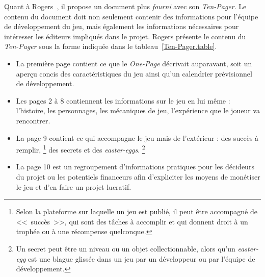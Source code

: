 



Quant \`a Rogers~\cite{LevelUpRogers2014}, il  propose un document plus \emph{fourni} avec son \emph{Ten-Pager}.
Le contenu du document doit non seulement contenir des informations pour l'équipe de développement du jeu, mais également les informations nécessaires pour int\'eresser les éditeurs impliqués dans le projet.
Rogers présente le contenu du \emph{Ten-Pager} sous la forme indiqu\'ee dans le tableau~\ref{Ten-Pager.table}.


\goodbreak

\begin{samepage}

\begin{itemize}

\item La première page contient ce que le \emph{One-Page} décrivait auparavant, soit un aperçu concis des caractéristiques du jeu ainsi qu'un calendrier prévisionnel de d\'eveloppement.

\item Les pages 2 à 8 contiennent les informations sur le jeu en lui même : l'histoire, les personnages, les mécaniques de jeu, l'expérience que le joueur va rencontrer.

\item La page 9 contient ce qui accompagne le jeu mais de l'extérieur : des succès à remplir, \footnote{Selon la plateforme sur laquelle un jeu est publié, il peut être accompagné de <<~succès~>>, qui sont des tâches à accomplir et qui donnent droit à un trophée ou \`a une récompense quelconque.} des secrets et des \emph{easter-eggs}.%
%
\footnote{Un secret peut être un niveau ou un objet collectionnable, alors qu'un \emph{easter-egg} est une blague glissée dans un jeu par un développeur ou par l'équipe de développement.}

\item La page 10 est un regroupement d'informations pratiques pour les décideurs du projet ou les potentiels financeurs afin d'expliciter les moyens de monétiser le jeu et d'en faire un projet lucratif.

\end{itemize}

\end{samepage}

